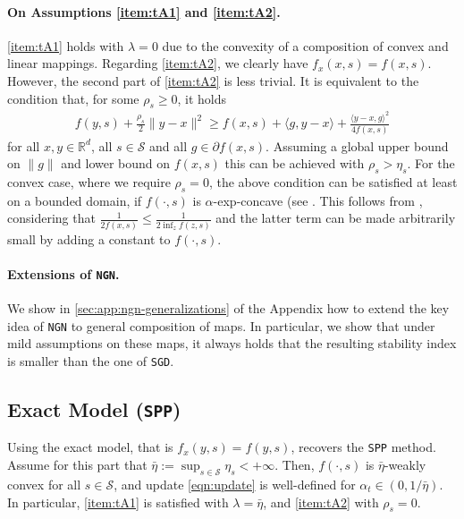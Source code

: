 \documentclass{article}
\newcommand{\iprod}[2]{\langle #1, #2 \rangle}
\newcommand{\R}{\mathbb{R}}
\newcommand{\SGD}{{\texttt{SGD}}}
\newcommand{\SPP}{{\texttt{SPP}}}
\newcommand{\NGN}{{\texttt{NGN}}}
\theoremstyle{plain}
\theoremstyle{definition}
\theoremstyle{remark}
\begin{document}
\paragraph{On Assumptions \ref{item:tA1} and \ref{item:tA2}.} \ref{item:tA1} holds with $\lambda=0$ due to the convexity of a composition of convex and linear mappings. Regarding \ref{item:tA2}, we clearly have $f_x(x,s) = f(x,s)$. However, the second part of \ref{item:tA2} is less trivial. It is equivalent to the condition that, for some $\rho_s\geq 0$, it holds
\begin{align*}
    f(y,s) + \tfrac{\rho_s}{2}\|y-x\|^2 \geq f(x,s) + \iprod{g}{y-x} + \frac{\iprod{y-x}{g}^2}{4f(x,s)} 
\end{align*}
for all $x,y\in \R^d$, all $s\in \mathcal{S}$ and all $g\in \partial f(x,s)$.
Assuming a global upper bound on $\|g\|$ and lower bound on $f(x,s)$ this can be achieved with $\rho_s > \eta_s$. For the convex case, where we require $\rho_s=0$, the above condition can be satisfied at least on a bounded domain, if $f(\cdot,s)$ is $\alpha$-exp-concave (see \citet[Def.\ 4.1]{Hazan2019a}. This follows from \citet[Lem.\ 4.3]{Hazan2019a}, considering that $\frac{1}{2f(x,s)} \leq \frac{1}{2\inf_z f(z,s)}$ and the latter term can be made arbitrarily small by adding a constant to $f(\cdot, s)$. 

\paragraph{Extensions of \NGN{}.} We show in \cref{sec:app:ngn-generalizations} of the Appendix how to extend the key idea of \NGN{} to general composition of maps. In particular, we show that under mild assumptions on these maps, it always holds that the resulting stability index is smaller than the one of \SGD{}.

%
%
\subsection{Exact Model (\SPP{})} \label{sec:sppmodel}
%
Using the exact model, that is $f_x(y,s) = f(y,s)$, recovers the \SPP{} method. Assume for this part that $\bar{\eta} := \sup_{s\in \mathcal{S}} \eta_s < +\infty$. Then, $f(\cdot,s)$ is $\bar{\eta}$-weakly convex for all $s\in \mathcal{S}$, and update \eqref{eqn:update} is well-defined for $\alpha_t \in (0, 1/\bar{\eta})$. In particular, \ref{item:tA1} is satisfied with $\lambda=\bar{\eta}$, and \ref{item:tA2} with $\rho_s=0$.
\end{document}
